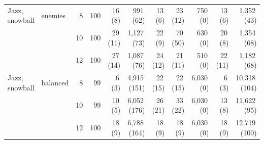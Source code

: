 \begin{table}[p]
{\begin{tabular}{llrrrrrrrrr}
\addlinespace[1pt]
Jazz, snowball & enemies & 8 & 100 & 16\,{\scriptsize(8)} & 991\,{\scriptsize(62)} & 13\,{\scriptsize(6)} & 23\,{\scriptsize(12)} & 750\,{\scriptsize(0)} & 13\,{\scriptsize(6)} & 1,352\,{\scriptsize(43)} \\
 &  & 10 & 100 & 29\,{\scriptsize(11)} & 1,127\,{\scriptsize(73)} & 22\,{\scriptsize(9)} & 70\,{\scriptsize(50)} & 630\,{\scriptsize(0)} & 20\,{\scriptsize(8)} & 1,354\,{\scriptsize(68)} \\
 &  & 12 & 100 & 27\,{\scriptsize(14)} & 1,087\,{\scriptsize(76)} & 24\,{\scriptsize(12)} & 21\,{\scriptsize(11)} & 510\,{\scriptsize(0)} & 22\,{\scriptsize(11)} & 1,182\,{\scriptsize(68)} \\
\addlinespace[1pt]
Jazz, snowball & balanced & 8 & 99 & 6\,{\scriptsize(3)} & 4,915\,{\scriptsize(151)} & 22\,{\scriptsize(15)} & 22\,{\scriptsize(15)} & 6,030\,{\scriptsize(0)} & 6\,{\scriptsize(3)} & 10,318\,{\scriptsize(104)} \\
 &  & 10 & 99 & 10\,{\scriptsize(5)} & 6,052\,{\scriptsize(176)} & 26\,{\scriptsize(21)} & 33\,{\scriptsize(22)} & 6,030\,{\scriptsize(0)} & 13\,{\scriptsize(8)} & 11,622\,{\scriptsize(95)} \\
 &  & 12 & 100 & 18\,{\scriptsize(9)} & 6,788\,{\scriptsize(164)} & 18\,{\scriptsize(9)} & 18\,{\scriptsize(9)} & 6,030\,{\scriptsize(0)} & 18\,{\scriptsize(9)} & 12,719\,{\scriptsize(100)} \\
\bottomrule
\end{tabular}}
\end{table}
